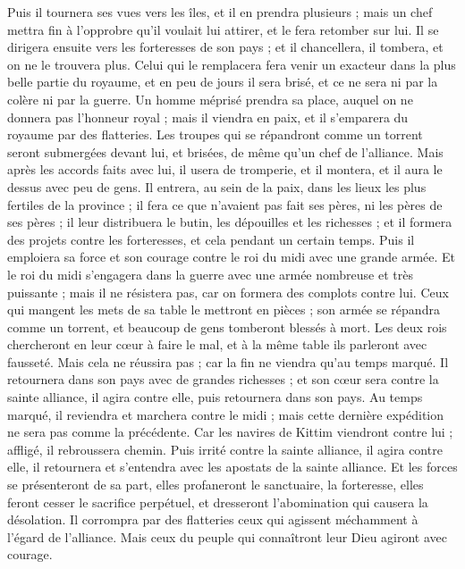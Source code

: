 \begin{multicols}{2}
Puis il tournera ses vues vers les îles, et il en prendra plusieurs ; mais un chef mettra fin à l'opprobre qu'il voulait lui attirer, et le fera retomber sur lui.
Il se dirigera ensuite vers les forteresses de son pays ; et il chancellera, il tombera, et on ne le trouvera plus.
Celui qui le remplacera fera venir un exacteur dans la plus belle partie du royaume, et en peu de jours il sera brisé, et ce ne sera ni par la colère ni par la guerre.
Un homme méprisé prendra sa place, auquel on ne donnera pas l'honneur royal ; mais il viendra en paix, et il s’emparera du royaume par des flatteries.
Les troupes qui se répandront comme un torrent seront submergées devant lui, et brisées, de même qu’un chef de l’alliance.
Mais après les accords faits avec lui, il usera de tromperie, et il montera, et il aura le dessus avec peu de gens.
Il entrera, au sein de la paix, dans les lieux les plus fertiles de la province ; il fera ce que n’avaient pas fait ses pères, ni les pères de ses pères ; il leur distribuera le butin, les dépouilles et les richesses ; et il formera des projets contre les forteresses, et cela pendant un certain temps.
Puis il emploiera sa force et son courage contre le roi du midi avec une grande armée. Et le roi du midi s’engagera dans la guerre avec une armée nombreuse et très puissante ; mais il ne résistera pas, car on formera des complots contre lui.
Ceux qui mangent les mets de sa table le mettront en pièces ; son armée se répandra comme un torrent, et beaucoup de gens tomberont blessés à mort.
Les deux rois chercheront en leur cœur à faire le mal, et à la même table ils parleront avec fausseté. Mais cela ne réussira pas ; car la fin ne viendra qu’au temps marqué.
Il retournera dans son pays avec de grandes richesses ; et son cœur sera contre la sainte alliance, il agira contre elle, puis retournera dans son pays.
Au temps marqué, il reviendra et marchera contre le midi ; mais cette dernière expédition ne sera pas comme la précédente.
Car les navires de Kittim viendront contre lui ; affligé, il rebroussera chemin. Puis irrité contre la sainte alliance, il agira contre elle, il retournera et s'entendra avec les apostats de la sainte alliance.
Et les forces se présenteront de sa part, elles profaneront le sanctuaire, la forteresse, elles feront cesser le sacrifice perpétuel, et dresseront l'abomination qui causera la désolation.
Il corrompra par des flatteries ceux qui agissent méchamment à l’égard de l'alliance. Mais ceux du peuple qui connaîtront leur Dieu agiront avec courage.

\end{multicols}
